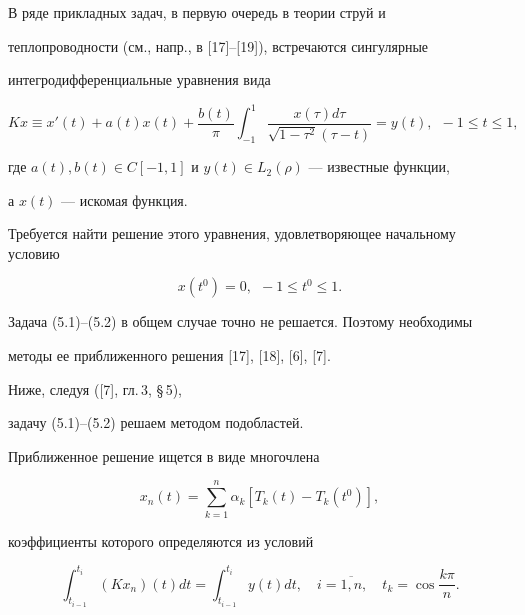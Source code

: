В ряде прикладных задач, в первую очередь в теории струй и


теплопроводности (см., напр., в [17]--[19]), встречаются сингулярные


интегродифференциальные уравнения вида


\begin{equation}


Kx\equiv x'(t)+a(t)x(t)+


\frac{b(t)}{\pi}


\int_{-1}^{1}\frac{x(\tau)d\tau}{\sqrt{1-\tau^2}(\tau-t)}=y(t),\ \


-1\le t \le 1,


\end{equation}


где $a(t),b(t)\in C[-1,1]$ и $y(t)\in L_2(\rho)$ --- известные функции,


а $x(t)$ --- искомая функция.


Требуется найти решение этого уравнения, удовлетворяющее начальному условию


\begin{equation}


x(t^0)=0,\ \ -1\le t^0 \le 1.


\end{equation}





Задача (5.1)--(5.2) в общем случае точно не решается. Поэтому необходимы


методы ее приближенного решения [17], [18], [6], [7].


Ниже, следуя ([7], гл.\,3, \S\,5),


задачу (5.1)--(5.2) решаем методом подобластей.


Приближенное решение ищется в виде многочлена


\begin{equation}


x_n(t)=\sum_{k=1}^{n}\alpha_k[T_k(t)-T_k(t^0)],


\end{equation}


коэффициенты которого определяются из условий


\begin{equation}


\int_{t_{i-1}}^{t_i}(Kx_n)(t)dt=\int_{t_{i-1}}^{t_i}y(t)dt,\quad


i=\overline{1,n},\quad t_k=\cos\frac{k\pi}{n}.


\end{equation}


